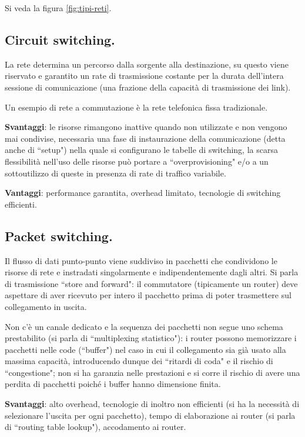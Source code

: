 \documentclass[11pt, italian, openany]{book}
\begin{document}
\begin{sloppypar}
Si veda la figura \ref{fig:tipi-reti}.

\subsection{Circuit switching.}
La rete determina un percorso dalla sorgente alla destinazione, su questo viene riservato e garantito un rate di trasmissione costante per la
durata dell'intera sessione di comunicazione (una frazione della capacit\`a di trasmissione dei link).

Un esempio di rete a commutazione \`e la rete telefonica fissa tradizionale.

\textbf{Svantaggi}: le risorse rimangono inattive quando non utilizzate e non vengono mai condivise, necessaria una fase di instaurazione della
comunicazione (detta anche di ``setup") nella quale si configurano le tabelle di switching, la scarsa flessibilit\`a nell'uso delle risorse pu\`o
portare a ``overprovisioning" e/o a un sottoutilizzo di queste in presenza di rate di traffico variabile.

\textbf{Vantaggi}: performance garantita, overhead limitato, tecnologie di switching efficienti.

\subsection{Packet switching.}
Il flusso di dati punto-punto viene suddiviso in pacchetti che condividono le risorse di rete e instradati singolarmente e indipendentemente
dagli altri. Si parla di trasmissione ``store and forward": il commutatore (tipicamente un router) deve aspettare di aver ricevuto per intero il
pacchetto prima di poter trasmettere sul collegamento in uscita.

Non c’\`e un canale dedicato e la sequenza dei pacchetti non segue uno schema prestabilito (si parla di ``multiplexing statistico"): i router
possono memorizzare i pacchetti nelle code (``buffer") nel caso in cui il collegamento sia gi\`a usato alla massima capacit\`a, introducendo
dunque dei ``ritardi di coda" e il rischio di ``congestione"; non si ha garanzia nelle prestazioni e si corre il rischio di avere una perdita
di pacchetti poich\'e i buffer hanno dimensione finita.

\textbf{Svantaggi}: alto overhead, tecnologie di inoltro non efficienti (si ha la necessit\`a di selezionare l’uscita per ogni pacchetto),
tempo di elaborazione ai router (si parla di ``routing table lookup"), accodamento ai router.


\end{sloppypar}
\end{document}
